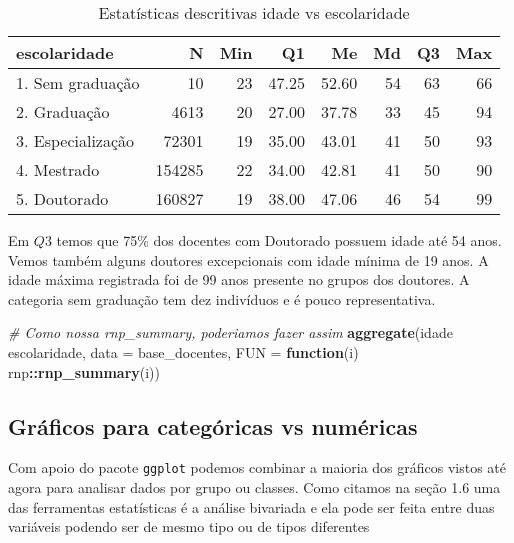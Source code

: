 \documentclass[12pt,]{style/krantz}
\makeatletter
\newenvironment{Shaded}{\begin{snugshade}}{\end{snugshade}}
\newcommand{\KeywordTok}[1]{\textcolor[rgb]{0.13,0.29,0.53}{\textbf{#1}}}
\newcommand{\DataTypeTok}[1]{\textcolor[rgb]{0.13,0.29,0.53}{#1}}
\newcommand{\StringTok}[1]{\textcolor[rgb]{0.31,0.60,0.02}{#1}}
\newcommand{\CommentTok}[1]{\textcolor[rgb]{0.56,0.35,0.01}{\textit{#1}}}
\newcommand{\ControlFlowTok}[1]{\textcolor[rgb]{0.13,0.29,0.53}{\textbf{#1}}}
\newcommand{\OperatorTok}[1]{\textcolor[rgb]{0.81,0.36,0.00}{\textbf{#1}}}
\newcommand{\NormalTok}[1]{#1}
\newenvironment{kframe}{%
\medskip{}
\setlength{\fboxsep}{.8em}
 \def\at@end@of@kframe{}%
 \ifinner\ifhmode%
  \def\at@end@of@kframe{\end{minipage}}%
  \begin{minipage}{\columnwidth}%
 \fi\fi%
 \def\FrameCommand##1{\hskip\@totalleftmargin \hskip-\fboxsep
 \colorbox{shadecolor}{##1}\hskip-\fboxsep
     \hskip-\linewidth \hskip-\@totalleftmargin \hskip\columnwidth}%
 \MakeFramed {\advance\hsize-\width
   \@totalleftmargin\z@ \linewidth\hsize
   \@setminipage}}%
 {\par\unskip\endMakeFramed%
 \at@end@of@kframe}
\renewenvironment{Shaded}{\begin{kframe}}{\end{kframe}}
\theoremstyle{definition}
\theoremstyle{definition}
\theoremstyle{definition}
\theoremstyle{remark}
\makeatother
\begin{document}
\begin{table}[!h]

\caption{\label{tab:tab11}Estatísticas descritivas idade vs escolaridade}
\centering
\begin{tabular}{lrrrrrrr}
\toprule
escolaridade & N & Min & Q1 & Me & Md & Q3 & Max\\
\midrule
1. Sem graduação & 10 & 23 & 47.25 & 52.60 & 54 & 63 & 66\\
2. Graduação & 4613 & 20 & 27.00 & 37.78 & 33 & 45 & 94\\
3. Especialização & 72301 & 19 & 35.00 & 43.01 & 41 & 50 & 93\\
4. Mestrado & 154285 & 22 & 34.00 & 42.81 & 41 & 50 & 90\\
5. Doutorado & 160827 & 19 & 38.00 & 47.06 & 46 & 54 & 99\\
\bottomrule
\end{tabular}
\end{table}

Em \(Q3\) temos que 75\% dos docentes com Doutorado possuem idade até 54
anos. Vemos também alguns doutores excepcionais com idade mínima de 19
anos. A idade máxima registrada foi de 99 anos presente no grupos dos
doutores. A categoria sem graduação tem dez indivíduos e é pouco
representativa.

\begin{Shaded}
\begin{Highlighting}[]
\CommentTok{# Como nossa rnp_summary, poderiamos fazer assim}
\KeywordTok{aggregate}\NormalTok{(idade }\OperatorTok{~}\StringTok{ }\NormalTok{escolaridade,}
          \DataTypeTok{data =}\NormalTok{ base_docentes,}
          \DataTypeTok{FUN =} \ControlFlowTok{function}\NormalTok{(i) rnp}\OperatorTok{::}\KeywordTok{rnp_summary}\NormalTok{(i))}
\end{Highlighting}
\end{Shaded}

\subsection{Gráficos para categóricas vs
numéricas}\label{graficos-para-categoricas-vs-numericas}

Com apoio do pacote \texttt{ggplot} podemos combinar a maioria dos
gráficos vistos até agora para analisar dados por grupo ou classes. Como
citamos na seção 1.6 uma das ferramentas estatísticas é a análise
bivariada e ela pode ser feita entre duas variáveis podendo ser de mesmo
tipo ou de tipos diferentes
\end{document}
